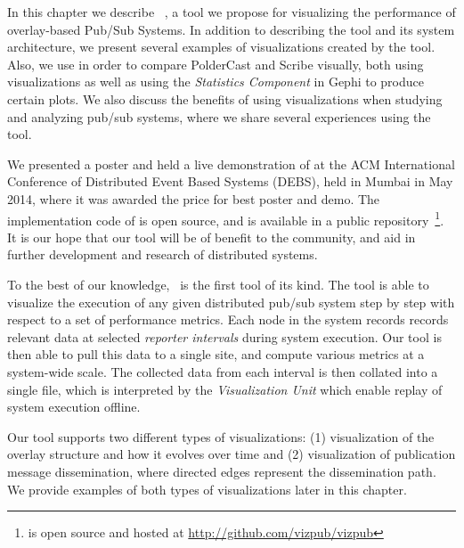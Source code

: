 In this chapter we describe \demo~\cite{korsveien2014vizpub}, a tool we
propose for visualizing the performance of overlay-based Pub/Sub
Systems. In addition to describing the tool and its system architecture,
we present several examples of visualizations created by the tool. Also,
we use \demo{} in order to compare PolderCast and Scribe visually, both
using visualizations as well as using the \emph{Statistics Component} in
Gephi to produce certain plots.  We also discuss the benefits of using
visualizations when studying and analyzing pub/sub systems, where we
share several experiences using the tool.

We presented a poster and held a live demonstration of \demo{} at the
ACM International Conference of Distributed Event Based Systems (DEBS),
held in Mumbai in May 2014, where it was awarded the price for best
poster and demo. The implementation code of \demo{} is open source, and
is available in a public repository~\footnote{\demo{} is open source and
    hosted at \url{http://github.com/vizpub/vizpub}}. It is our hope
that our tool will be of benefit to the community, and aid in further
development and research of distributed systems.

To the best of our knowledge, \demo~is the first tool of its kind. The
tool is able to visualize the execution of any given distributed pub/sub
system step by step with respect to a set of performance metrics. Each
node in the system records records relevant data at selected
\emph{reporter intervals} during system execution. Our tool is then able
to pull this data to a single site, and compute various metrics at a
system-wide scale. The collected data from each interval is then
collated into a single \gexf{} file, which is interpreted by the
\emph{Visualization Unit} which enable replay of system execution
offline.

Our tool supports two different types of visualizations: (1) visualization of the
overlay structure and how it evolves over time and (2) visualization of
publication message dissemination, where directed edges represent the
dissemination path. We provide examples of both types of visualizations
later in this chapter.

